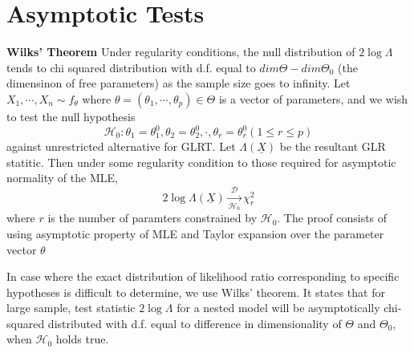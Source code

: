\documentclass[11pt]{article}
\begin{document}
\section*{Asymptotic Tests}

\begin{theorem*}
  \textbf{Wilks' Theorem} Under regularity conditions, the null distribution of $2\log \Lambda$ tends to chi squared distribution with d.f. equal to $dim \Theta - dim \Theta_0$ (the dimensinon of free parameters) as the sample size goes to infinity. Let $X_1, \cdots, X_n \sim f_{\theta}$ where $\theta = (\theta_1, \cdots, \theta_p)\in \Theta$ is a vector of parameters, and we wish to test the null hypothesis
  \[
    \mathcal{H}_0: \theta_1 = \theta_1^0, \theta_2 = \theta_2^0, \cdot, \theta_r = \theta_r^0 (1 \leq r \leq p)
  \]
  against unrestricted alternative for GLRT. Let $\Lambda(\underline{X})$ be the resultant GLR statitic. Then under some regularity condition to those required for asymptotic normality of the MLE,
  \[
    2\log \Lambda(\underline{X}) \xrightarrow[\mathcal{H}_0]{\mathcal{D}} \chi_r^2
  \]
  where $r$ is the number of paramters constrained by $\mathcal{H}_0$. The proof consists of using asymptotic property of MLE and Taylor expansion over the parameter vector $\theta$
  \begin{rem}
    In case where the exact distribution of likelihood ratio corresponding to specific hypotheses is difficult to determine, we use Wilks' theorem. It states that for large sample, test statistic $2\log \Lambda$ for a nested model will be asymptotically chi-squared distributed with d.f. equal to difference in dimensionality of $\Theta$ and $\Theta_0$, when $\mathcal{H}_0$ holds true.
  \end{rem}
\end{theorem*}
\end{document}
